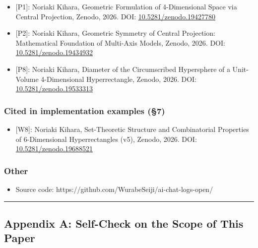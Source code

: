 \documentclass[
  a4paper,11pt]{article}
\providecommand{\tightlist}{%
  \setlength{\itemsep}{0pt}\setlength{\parskip}{0pt}}
\begin{document}
\begin{itemize}
\tightlist
\item
  {[}P1{]}: Noriaki Kihara, Geometric Formulation of 4-Dimensional Space
  via Central Projection, Zenodo, 2026. DOI:
  \href{https://doi.org/10.5281/zenodo.19427780}{10.5281/zenodo.19427780}
\item
  {[}P2{]}: Noriaki Kihara, Geometric Symmetry of Central Projection:
  Mathematical Foundation of Multi-Axis Models, Zenodo, 2026. DOI:
  \href{https://doi.org/10.5281/zenodo.19434932}{10.5281/zenodo.19434932}
\item
  {[}P8{]}: Noriaki Kihara, Diameter of the Circumscribed Hypersphere of
  a Unit-Volume 4-Dimensional Hyperrectangle, Zenodo, 2026. DOI:
  \href{https://doi.org/10.5281/zenodo.19533313}{10.5281/zenodo.19533313}
\end{itemize}

\subsubsection{Cited in implementation examples
(§7)}\label{cited-in-implementation-examples-7}

\begin{itemize}
\tightlist
\item
  {[}W8{]}: Noriaki Kihara, Set-Theoretic Structure and Combinatorial
  Properties of 6-Dimensional Hyperrectangles (v5), Zenodo, 2026. DOI:
  \href{https://doi.org/10.5281/zenodo.19688521}{10.5281/zenodo.19688521}
\end{itemize}

\subsubsection{Other}\label{other}

\begin{itemize}
\tightlist
\item
  Source code: https://github.com/WurabeSeiji/ai-chat-logs-open/
\end{itemize}

\begin{center}\rule{0.5\linewidth}{0.5pt}\end{center}

\subsection{Appendix A: Self-Check on the Scope of This
Paper}\label{appendix-a-self-check-on-the-scope-of-this-paper}
\end{document}
